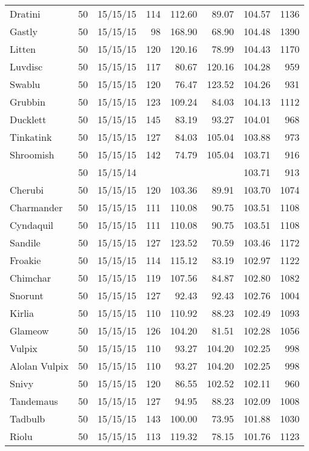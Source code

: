 \begin{longtable}{lrrrrrrr}
Dratini & 50 & 15/15/15 & 114 & 112.60 & 89.07 & 104.57 & 1136\\
Gastly & 50 & 15/15/15 & 98 & 168.90 & 68.90 & 104.48 & 1390\\
Litten & 50 & 15/15/15 & 120 & 120.16 & 78.99 & 104.43 & 1170\\
Luvdisc & 50 & 15/15/15 & 117 & 80.67 & 120.16 & 104.28 &  959\\
Swablu & 50 & 15/15/15 & 120 & 76.47 & 123.52 & 104.26 &  931\\
Grubbin & 50 & 15/15/15 & 123 & 109.24 & 84.03 & 104.13 & 1112\\
Ducklett & 50 & 15/15/15 & 145 & 83.19 & 93.27 & 104.01 &  968\\
Tinkatink & 50 & 15/15/15 & 127 & 84.03 & 105.04 & 103.88 &  973\\
Shroomish & 50 & 15/15/15 & 142 & 74.79 & 105.04 & 103.71 &  916\\
 & 50 & 15/15/14 & & & & 103.71 &  913\\
Cherubi & 50 & 15/15/15 & 120 & 103.36 & 89.91 & 103.70 & 1074\\
Charmander & 50 & 15/15/15 & 111 & 110.08 & 90.75 & 103.51 & 1108\\
Cyndaquil & 50 & 15/15/15 & 111 & 110.08 & 90.75 & 103.51 & 1108\\
Sandile & 50 & 15/15/15 & 127 & 123.52 & 70.59 & 103.46 & 1172\\
Froakie & 50 & 15/15/15 & 114 & 115.12 & 83.19 & 102.97 & 1122\\
Chimchar & 50 & 15/15/15 & 119 & 107.56 & 84.87 & 102.80 & 1082\\
Snorunt & 50 & 15/15/15 & 127 & 92.43 & 92.43 & 102.76 & 1004\\
Kirlia & 50 & 15/15/15 & 110 & 110.92 & 88.23 & 102.49 & 1093\\
Glameow & 50 & 15/15/15 & 126 & 104.20 & 81.51 & 102.28 & 1056\\
Vulpix & 50 & 15/15/15 & 110 & 93.27 & 104.20 & 102.25 &  998\\
Alolan Vulpix & 50 & 15/15/15 & 110 & 93.27 & 104.20 & 102.25 &  998\\
Snivy & 50 & 15/15/15 & 120 & 86.55 & 102.52 & 102.11 &  960\\
Tandemaus & 50 & 15/15/15 & 127 & 94.95 & 88.23 & 102.09 & 1008\\
Tadbulb & 50 & 15/15/15 & 143 & 100.00 & 73.95 & 101.88 & 1030\\
Riolu & 50 & 15/15/15 & 113 & 119.32 & 78.15 & 101.76 & 1123\\

\end{longtable}
